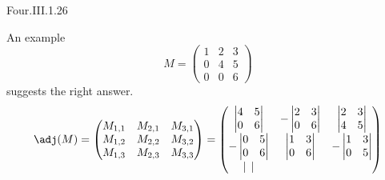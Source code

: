 \begin{ans}{Four.III.1.26}
      \begin{exparts}
        \partsitem An example
          \begin{equation*}
             M=
            \begin{pmatrix}
              1  &2  &3  \\
              0  &4  &5  \\
              0  &0  &6
            \end{pmatrix}
          \end{equation*}
          suggests the right answer.
          \begin{equation*}
            \adj(M)=
            \begin{pmatrix}
             M_{1,1}  &M_{2,1}  &M_{3,1}  \\
             M_{1,2}  &M_{2,2}  &M_{3,2}  \\
             M_{1,3}  &M_{2,3}  &M_{3,3}
            \end{pmatrix}
            =\begin{pmatrix}
              \begin{vmatrix}
                4  &5 \\ 0 &6
              \end{vmatrix}
              &-\begin{vmatrix}
                2  &3  \\  0  &6
              \end{vmatrix}
              &\begin{vmatrix}
                2  &3  \\  4  &5
              \end{vmatrix}          \\[1.5ex]
              -\begin{vmatrix}
                0  &5  \\  0  &6
              \end{vmatrix}
              &\begin{vmatrix}
                1  &3  \\  0  &6
              \end{vmatrix}
              &-\begin{vmatrix}
                1  &3  \\  0  &5
              \end{vmatrix}           \\[1.5ex]
              \begin{vmatrix}

\end{vmatrix}
\end{pmatrix}
\end{equation*}
\end{exparts}
\end{ans}
